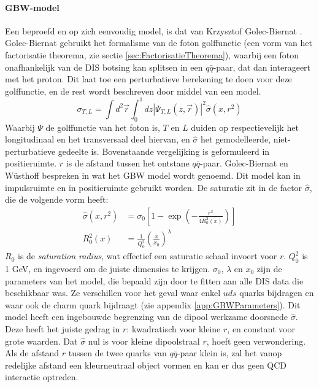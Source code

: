 \documentclass[a4paper,11pt]{article}
\numberwithin{equation}{section} %
\begin{document}
      \paragraph{GBW-model}
Een beproefd en op zich eenvoudig model, is dat van Krzysztof Golec-Biernat \cite{GB}.
Golec-Biernat gebruikt het formalisme van de foton golffunctie (een vorm van het factorisatie theorema, zie sectie \ref{sec:FactorisatieTheorema}), waarbij een foton onafhankelijk van de DIS botsing kan splitsen in een $q\bar{q}$-paar, dat dan interageert met het proton.
Dit laat toe een perturbatieve berekening te doen voor deze golffunctie, en de rest wordt beschreven door middel van een model.
\begin{equation}
\sigma_{T,L} = \int d^2 \vec{r} \int_0^1 dz |\Psi_{T,L} (z, \vec{r})|^2 \hat{\sigma} (x,r^2)
\end{equation}
Waarbij $\Psi$ de golffunctie van het foton is, $T$ en $L$ duiden op respectievelijk het longitudinaal en het transversaal deel hiervan, en $\hat{\sigma}$ het gemodelleerde, niet-perturbatieve gedeelte is.
Bovenstaande vergelijking is geformuleerd in positieruimte.
$r$ is de afstand tussen het ontstane $q\bar{q}$-paar.
Golec-Biernat en Wüsthoff bespreken in \cite{GBW} wat het GBW model wordt genoemd.
Dit model kan in impulsruimte en in positieruimte gebruikt worden.
De saturatie zit in de factor $\hat{\sigma}$, die de volgende vorm heeft:
\begin{align}
\hat{\sigma}(x,r^2) &= \sigma_0 \left[ 1- \exp{\left(-\frac{r^2}{4 R_0^2(x)}\right)} \right] \\
R_0^2(x) &= \frac{1}{Q_0^2} \left( \frac{x}{x_0} \right)^\lambda \label{eq:R0}
\end{align}
$R_0$ is de \textit{saturation radius}, wat effectief een saturatie schaal invoert voor $r$.
$Q_0^2$ is 1 GeV, en ingevoerd om de juiste dimensies te krijgen.
$\sigma_0$, $\lambda$ en $x_0$ zijn de parameters van het model, die bepaald zijn door te fitten aan alle DIS data die beschikbaar was.
Ze verschillen voor het geval waar enkel $uds$ quarks bijdragen en waar ook de charm quark bijdraagt (zie appendix \ref{app:GBWParameters}).
Dit model heeft een ingebouwde begrenzing van de dipool werkzame doorsnede $\hat{\sigma}$.
Deze heeft het juiste gedrag in $r$: kwadratisch voor kleine $r$, en constant voor grote waarden.
Dat $\hat{\sigma}$ nul is voor kleine dipoolstraal $r$, hoeft geen verwondering.
Als de afstand $r$ tussen de twee quarks van $q\bar{q}$-paar klein is, zal het vanop redelijke afstand een kleurneutraal object vormen en kan er dus geen QCD interactie optreden.
\end{document}
